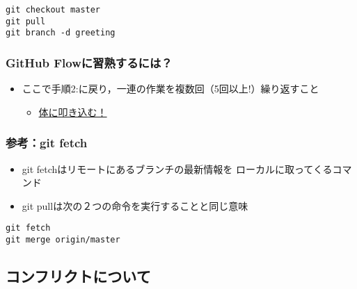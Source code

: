 \documentclass[a4paper,twoside,twocolumn]{bxjsarticle}
\begin{document}
\begin{verbatim}
git checkout master
git pull
git branch -d greeting
\end{verbatim}

\subsubsection{GitHub Flowに習熟するには？}
\label{sec-2-3-11}
\begin{itemize}
\item ここで手順2:に戻り，一連の作業を複数回（5回以上!）繰り返すこと
\begin{itemize}
\item \uline{体に叩き込む！}
\end{itemize}
\end{itemize}

\subsubsection{参考：git fetch}
\label{sec-2-3-12}
\begin{itemize}
\item git fetchはリモートにあるブランチの最新情報を
ローカルに取ってくるコマンド
\item git pullは次の２つの命令を実行することと同じ意味
\end{itemize}

\begin{verbatim}
git fetch
git merge origin/master
\end{verbatim}


\subsection{コンフリクトについて}
\label{sec-2-4}
\end{document}
